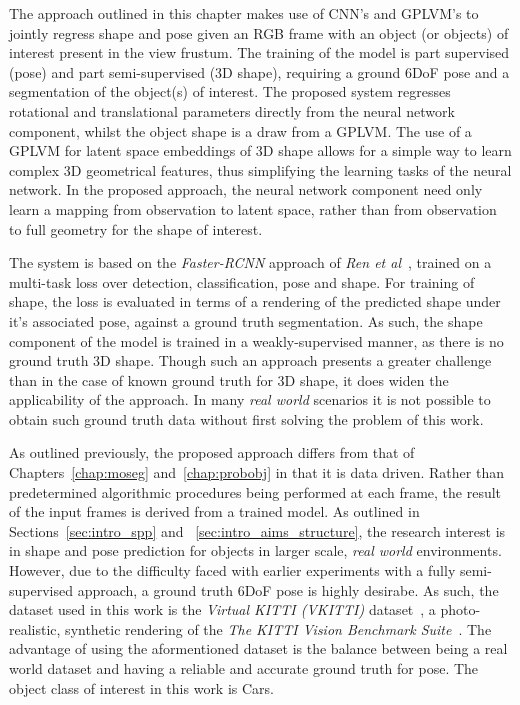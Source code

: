 The approach outlined in this chapter makes use of CNN's and GPLVM's to jointly regress shape and pose 
given an RGB frame with an object (or objects) of interest present in the view frustum. The training of 
the model is part supervised (pose) and part semi-supervised (3D shape), requiring a ground 6DoF pose and 
a segmentation of the object(s) of interest. The proposed system regresses rotational and translational 
parameters directly from the neural network component, whilst the object shape is a draw from a GPLVM\@. 
The use of a GPLVM for latent space embeddings of 3D shape allows for a simple way to learn complex 3D 
geometrical features, thus simplifying the learning tasks of the neural network. In the proposed approach, 
the neural network component need only learn a mapping from observation to latent space, rather than from 
observation to full geometry for the shape of interest.

The system is based on the \textit{Faster-RCNN} approach of \textit{Ren et al}~\cite{Ren2015RCNN}, trained 
on a multi-task loss over detection, classification, pose and shape. For training of shape, the loss is evaluated 
in terms of a rendering of the predicted shape under it's associated pose, against a ground truth segmentation. 
As such, the shape component of the model is trained in a weakly-supervised manner, as there is no ground truth 
3D shape. Though such an approach presents a greater challenge than in the case of known ground truth for 3D shape, 
it does widen the applicability of the approach. In many \textit{real world} scenarios it is not possible to obtain 
such ground truth data without first solving the problem of this work.

As outlined previously, the proposed approach differs from that of Chapters~\ref{chap:moseg} and~\ref{chap:probobj} 
in that it is data driven. Rather than predetermined algorithmic procedures being performed at each frame, the 
result of the input frames is derived from a trained model. As outlined in Sections~\ref{sec:intro_spp} and
~\ref{sec:intro_aims_structure}, the research interest is in shape and pose prediction for objects in larger scale, 
\textit{real world} environments. However, due to the difficulty faced with earlier experiments with a fully semi-supervised 
approach, a ground truth 6DoF pose is highly desirabe. As such, the dataset used in this work is the \textit{Virtual KITTI (VKITTI)} 
dataset~\cite{Gaidon2016}, a photo-realistic, synthetic rendering of the \textit{The KITTI Vision Benchmark Suite}~\cite{Geiger2013,Menze2015,Geiger2012}. 
The advantage of using the aformentioned dataset is the balance between being a real world dataset and having a reliable and 
accurate ground truth for pose. The object class of interest in this work is Cars.

